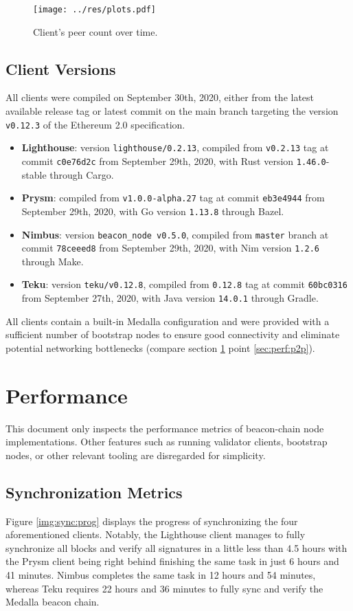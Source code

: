 \documentclass[twoside,twocolumn]{article}
\begin{document}
\begin{figure}[t]
	\centering
	\texttt{[image: ../res/plots.pdf]}
	\caption{Client's peer count over time.}
	\label{img:per}
\end{figure}

\subsection{Client Versions}
All clients were compiled on September 30th, 2020, either from the latest available release tag or latest commit on the main branch targeting the version \texttt{v0.12.3} of the Ethereum 2.0 specification.

\begin{itemize}
\item \textbf{Lighthouse}: version \texttt{lighthouse/0.2.13}, compiled from \texttt{v0.2.13} tag at commit \texttt{c0e76d2c} from September 29th, 2020, with Rust version \texttt{1.46.0}-stable through Cargo.
\item \textbf{Prysm}: compiled from \texttt{v1.0.0-alpha.27} tag at commit \texttt{eb3e4944} from September 29th, 2020, with Go version \texttt{1.13.8} through Bazel.
\item \textbf{Nimbus}: version \texttt{beacon\_node v0.5.0}, compiled from \texttt{master} branch at commit \texttt{78ceeed8} from September 29th, 2020, with Nim version \texttt{1.2.6} through Make.
\item \textbf{Teku}: version \texttt{teku/v0.12.8}, compiled from \texttt{0.12.8} tag at commit \texttt{60bc0316} from September 27th, 2020, with Java version \texttt{14.0.1} through Gradle.
\end{itemize}

All clients contain a built-in Medalla configuration and were provided with a sufficient number of bootstrap nodes to ensure good connectivity and eliminate potential networking bottlenecks (compare section \ref{sec:perf} point \ref{sec:perf:p2p}).\par

\section{Performance}
\label{sec:perf}
This document only inspects the performance metrics of beacon-chain node implementations. Other features such as running validator clients, bootstrap nodes, or other relevant tooling are disregarded for simplicity.

\subsection{Synchronization Metrics}
Figure \ref{img:sync:prog} displays the progress of synchronizing the four aforementioned clients. Notably, the Lighthouse client manages to fully synchronize all blocks and verify all signatures in a little less than 4.5 hours with the Prysm client being right behind finishing the same task in just 6 hours and 41 minutes. Nimbus completes the same task in 12 hours and 54 minutes, whereas Teku requires 22 hours and 36 minutes to fully sync and verify the Medalla beacon chain.\par
\end{document}
